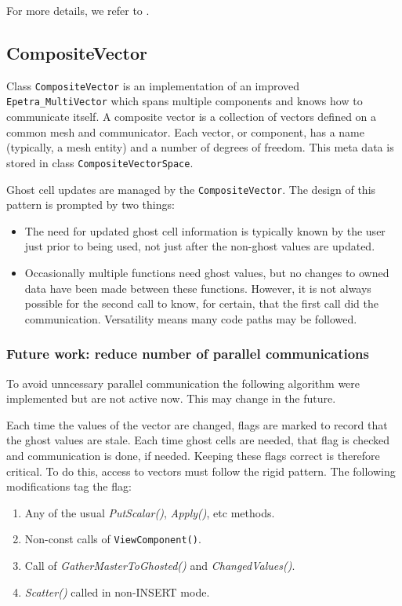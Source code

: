 For more details, we refer to \cite{coon2016managing}.


\subsection{CompositeVector}
Class {\tt CompositeVector} is an implementation of an improved
{\tt Epetra\_MultiVector} which spans multiple components and knows how to
communicate itself.
A composite vector is a collection of vectors defined on a common mesh and
communicator. 
Each vector, or component, has a name (typically, a mesh entity)
and a number of degrees of freedom.  
This meta data is stored in class {\tt CompositeVectorSpace}.

Ghost cell updates are managed by the {\tt CompositeVector}. 
The design of this pattern is prompted by two things:
\begin{itemize}
\item The need for updated ghost cell information is typically known by the
      user just prior to being used, not just after the non-ghost values are
      updated.
\item Occasionally multiple functions need ghost values, but no changes to
      owned data have been made between these functions.  However, it is not
      always possible for the second call to know, for certain, that the first
      call did the communication.  Versatility means many code paths may be
      followed.
\end{itemize}


\subsubsection{Future work: reduce number of parallel communications}
To avoid unncessary parallel communication the following algorithm were implemented
but are not active now.
This may change in the future.

Each time the values of the vector are changed, flags are marked to
record that the ghost values are stale.
Each time ghost cells are needed, that flag is checked and communication
is done, if needed.
Keeping these flags correct is therefore critical. 
To do this, access to vectors must follow the rigid pattern.
The following modifications tag the flag:

\begin{enumerate}
\item Any of the usual {\it PutScalar()}, {\it Apply()}, etc methods.
\item Non-const calls of {\tt ViewComponent()}.
\item Call of {\it GatherMasterToGhosted()} and {\it ChangedValues()}.
\item {\it Scatter()} called in non-INSERT mode.
\end{enumerate}

